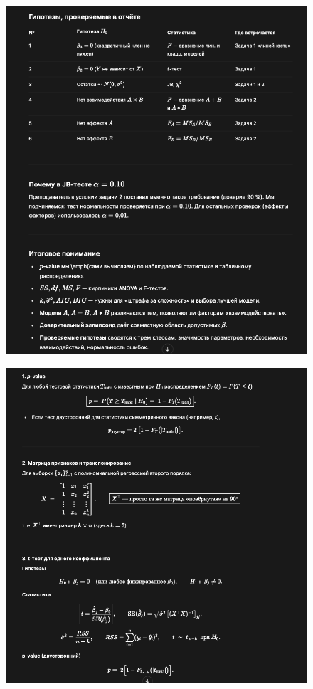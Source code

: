 \documentclass[12pt]{article}
\begin{document}
\newpage
\begin{figure}[H]
    \centering
    \includegraphics[width=1\linewidth]{image copy 2.png}
\end{figure}
\newpage
\begin{figure}[H]
    \centering
    \includegraphics[width=1\linewidth]{image copy 3.png}
\end{figure}
\end{document}
